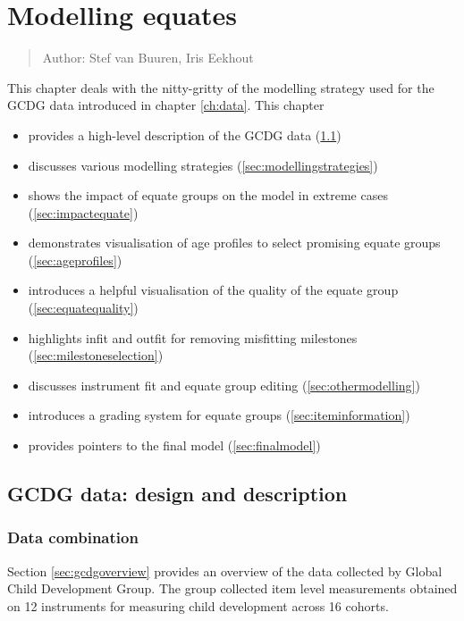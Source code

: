 \documentclass[
]{book}
\providecommand{\tightlist}{%
  \setlength{\itemsep}{0pt}\setlength{\parskip}{0pt}}
\begin{document}
\hypertarget{ch:modellingequates}{%
\chapter{Modelling equates}\label{ch:modellingequates}}

\begin{quote}
Author: Stef van Buuren, Iris Eekhout
\end{quote}

This chapter deals with the nitty-gritty of the modelling strategy used for the GCDG data introduced in chapter \ref{ch:data}. This chapter

\begin{itemize}
\tightlist
\item
  provides a high-level description of the GCDG data (\ref{sec:gcdgdata})
\item
  discusses various modelling strategies (\ref{sec:modellingstrategies})
\item
  shows the impact of equate groups on the model in extreme cases (\ref{sec:impactequate})
\item
  demonstrates visualisation of age profiles to select promising equate groups (\ref{sec:ageprofiles})
\item
  introduces a helpful visualisation of the quality of the equate group (\ref{sec:equatequality})
\item
  highlights infit and outfit for removing misfitting milestones (\ref{sec:milestoneselection})
\item
  discusses instrument fit and equate group editing (\ref{sec:othermodelling})
\item
  introduces a grading system for equate groups (\ref{sec:iteminformation})
\item
  provides pointers to the final model (\ref{sec:finalmodel})
\end{itemize}

\hypertarget{sec:gcdgdata}{%
\section{GCDG data: design and description}\label{sec:gcdgdata}}

\hypertarget{data-combination}{%
\subsection{Data combination}\label{data-combination}}

Section \ref{sec:gcdgoverview} provides an overview of the data collected by Global Child Development Group. The group collected item level measurements obtained on 12 instruments for measuring child development across 16 cohorts.
\end{document}
